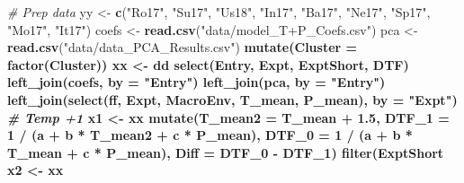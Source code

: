 \documentclass[
]{article}
\newenvironment{Shaded}{\begin{snugshade}}{\end{snugshade}}
\newcommand{\CommentTok}[1]{\textcolor[rgb]{0.56,0.35,0.01}{\textit{#1}}}
\newcommand{\DataTypeTok}[1]{\textcolor[rgb]{0.13,0.29,0.53}{#1}}
\newcommand{\DecValTok}[1]{\textcolor[rgb]{0.00,0.00,0.81}{#1}}
\newcommand{\FloatTok}[1]{\textcolor[rgb]{0.00,0.00,0.81}{#1}}
\newcommand{\KeywordTok}[1]{\textcolor[rgb]{0.13,0.29,0.53}{\textbf{#1}}}
\newcommand{\NormalTok}[1]{#1}
\newcommand{\OperatorTok}[1]{\textcolor[rgb]{0.81,0.36,0.00}{\textbf{#1}}}
\newcommand{\StringTok}[1]{\textcolor[rgb]{0.31,0.60,0.02}{#1}}
\begin{document}
\begin{Shaded}
\begin{Highlighting}[]
\CommentTok{# Prep data}
\NormalTok{yy <-}\StringTok{ }\KeywordTok{c}\NormalTok{(}\StringTok{"Ro17"}\NormalTok{, }\StringTok{"Su17"}\NormalTok{, }\StringTok{"Us18"}\NormalTok{, }\StringTok{"In17"}\NormalTok{, }\StringTok{"Ba17"}\NormalTok{, }\StringTok{"Ne17"}\NormalTok{, }\StringTok{"Sp17"}\NormalTok{, }\StringTok{"Mo17"}\NormalTok{, }\StringTok{"It17"}\NormalTok{)}
\NormalTok{coefs <-}\StringTok{ }\KeywordTok{read.csv}\NormalTok{(}\StringTok{"data/model_T+P_Coefs.csv"}\NormalTok{)}
\NormalTok{pca <-}\StringTok{ }\KeywordTok{read.csv}\NormalTok{(}\StringTok{"data/data_PCA_Results.csv"}\NormalTok{) }\OperatorTok{%
\StringTok{  }\KeywordTok{mutate}\NormalTok{(}\DataTypeTok{Cluster =} \KeywordTok{factor}\NormalTok{(Cluster))}
\NormalTok{xx <-}\StringTok{ }\NormalTok{dd }\OperatorTok{%
\StringTok{  }\KeywordTok{select}\NormalTok{(Entry, Expt, ExptShort, DTF) }\OperatorTok{%
\StringTok{  }\KeywordTok{left_join}\NormalTok{(coefs, }\DataTypeTok{by =} \StringTok{"Entry"}\NormalTok{) }\OperatorTok{%
\StringTok{  }\KeywordTok{left_join}\NormalTok{(pca, }\DataTypeTok{by =} \StringTok{"Entry"}\NormalTok{) }\OperatorTok{%
\StringTok{  }\KeywordTok{left_join}\NormalTok{(}\KeywordTok{select}\NormalTok{(ff, Expt, MacroEnv, T_mean, P_mean), }\DataTypeTok{by =} \StringTok{"Expt"}\NormalTok{)}
\CommentTok{# Temp +1}
\NormalTok{x1 <-}\StringTok{ }\NormalTok{xx }\OperatorTok{%
\StringTok{  }\KeywordTok{mutate}\NormalTok{(}\DataTypeTok{T_mean2 =}\NormalTok{ T_mean }\OperatorTok{+}\StringTok{ }\FloatTok{1.5}\NormalTok{,}
         \DataTypeTok{DTF_1 =} \DecValTok{1} \OperatorTok{/}\StringTok{ }\NormalTok{(a }\OperatorTok{+}\StringTok{ }\NormalTok{b }\OperatorTok{*}\StringTok{ }\NormalTok{T_mean2 }\OperatorTok{+}\StringTok{ }\NormalTok{c }\OperatorTok{*}\StringTok{ }\NormalTok{P_mean),}
         \DataTypeTok{DTF_0  =} \DecValTok{1} \OperatorTok{/}\StringTok{ }\NormalTok{(a }\OperatorTok{+}\StringTok{ }\NormalTok{b }\OperatorTok{*}\StringTok{ }\NormalTok{T_mean }\OperatorTok{+}\StringTok{ }\NormalTok{c }\OperatorTok{*}\StringTok{ }\NormalTok{P_mean),}
         \DataTypeTok{Diff =}\NormalTok{ DTF_}\DecValTok{0} \OperatorTok{-}\StringTok{ }\NormalTok{DTF_}\DecValTok{1}\NormalTok{) }\OperatorTok{%
\StringTok{  }\KeywordTok{filter}\NormalTok{(ExptShort }\OperatorTok{%
\NormalTok{x2 <-}\StringTok{ }\NormalTok{xx }\OperatorTok{%
}}}}}}}}}
\end{Highlighting}
\end{Shaded}
\end{document}
